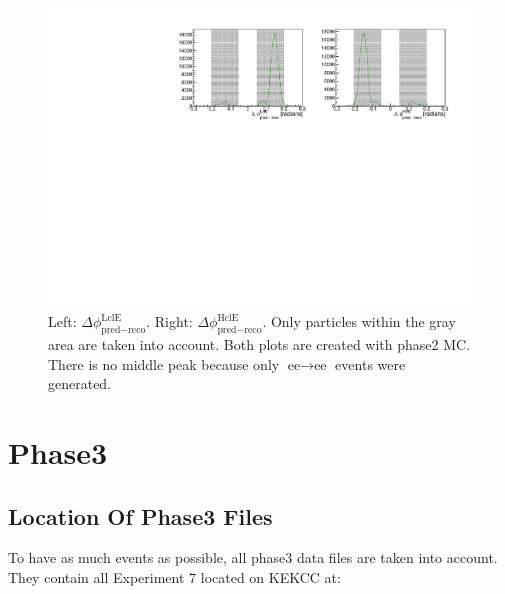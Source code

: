\documentclass[a4paper,11pt,twosided,final,german,openbib,pdftex,listof=totoc,bibliography=totoc]{scrbook}
\begin{document}
\begin{appendix}
\begin{figure}[h!]
	\centering
	\includegraphics[width=\textwidth]{Plots/master/hb2b_MC.pdf}
	\caption[b2bClusterPhi - clusterPhi For Phase2 MC]{Left: $\Delta \phi _{\textrm{pred} - \textrm{reco}}^{\textrm{LclE}}$. Right:  $\Delta \phi _{\textrm{pred} - \textrm{reco}}^{\textrm{HclE}}$. Only particles within the gray area are taken into account. Both plots are created with phase2 MC. There is no middle peak because only $\textrm{ee} \rightarrow \textrm{ee}$ events were generated.}
	\label{fig:b2bMC2}
\end{figure}



















\clearpage
\section{Phase3}


\subsection{Location Of Phase3 Files}



To have as much events as possible, all phase3 data files are taken into account. They contain all Experiment 7 located on KEKCC at:
\newline


\end{appendix}
\end{document}
